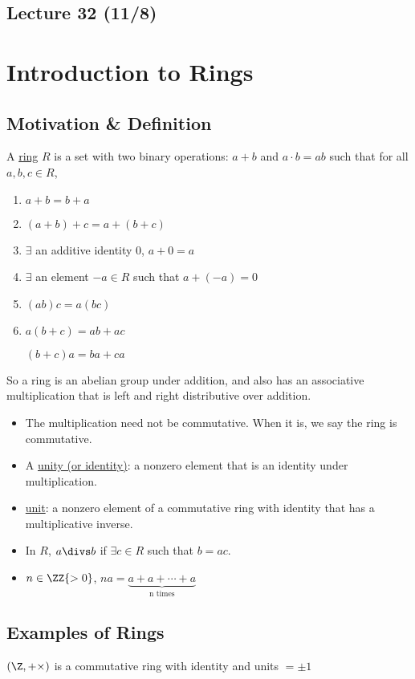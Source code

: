 \subsection*{Lecture 32 (11/8)} %
\section{Introduction to Rings}
\subsection{Motivation \& Definition}
\begin{definition}[Ring]
  A \uline{ring} \(R\) is a set with two binary operations: \(a+b\) and \(a\cdot b=ab\) such that for all \(a,b,c\in R\),
  \begin{enumerate}
    \item \(a+b = b+a\)
    \item \((a+b)+c = a+(b+c)\)
    \item \(\exists\) an additive identity \(0\), \(a+0 = a\)
    \item \(\exists\) an element \(-a\in R\) such that \(a+(-a)=0\)
    \item \((ab)c = a(bc)\)
    \item \(a(b+c) = ab+ac\)

    \((b+c)a = ba+ca\)
  \end{enumerate}
\end{definition}

So a ring is an abelian group under addition, and also has an associative multiplication that is left and right distributive over addition.
\begin{itemize}
  \item The multiplication need not be commutative. When it is, we say the ring is commutative.
  \item A \uline{unity (or identity)}: a nonzero element that is an identity under multiplication.
  \item \uline{unit}: a nonzero element of a commutative ring with identity that has a multiplicative inverse.
  \item In \(R\), \(a\divs b\) if \(\exists c\in R\) such that \(b=ac\).
  \item \(n\in \ZZ{>0}\), \(na = \underbrace{a+a+\cdots+a}_{\text{n times}}\)
\end{itemize}

\subsection{Examples of Rings}
\begin{example}
  \((\Z, +\times)\) is a commutative ring with identity and units \(=\pm 1\)
\end{example}

